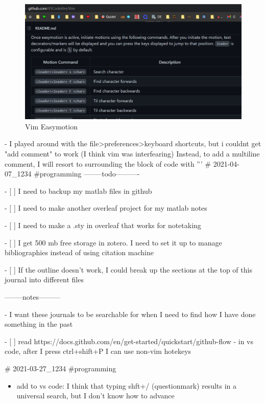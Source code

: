 \begin{figure}
    \centering
    \includegraphics[width=1\linewidth]{easymotion.png}
    \caption{Vim Easymotion}
\end{figure}

- I played around with the
file\textgreater preferences\textgreater keyboard shortcuts, but i
couldnt get "add comment" to work (I think vim was interfearing)
Instead, to add a multiline comment, I will resort to surrounding the
block of code with '''
# 2021-04-07_1234
#programming
--------todo----------

- [ ] I need to backup my matlab files in github
  
- [ ] I need to make another overleaf project for my matlab notes
  
- [ ] I need to make a .sty in overleaf that works for notetaking

- [ ] I get 500 mb free storage in zotero. I need to set it up to manage bibliographies instead of using citation machine

- [ ] If the outline doesn't work, I could break up the sections at the top of this
journal into different files

--------notes---------

- I want these journals to be searchable for when I need to find how I have done something in the past

- [ ] read https://docs.github.com/en/get-started/quickstart/github-flow
  - in vs code, after I press ctrl+shift+P I can use non-vim hotekeys

# 2021-03-27_1234
#programming
\begin{itemize}
\tightlist
\item
  add to vs code: I think that typing shft+/ (questionmark) results in a
  universal search, but I don't know how to advance
\end{itemize}

